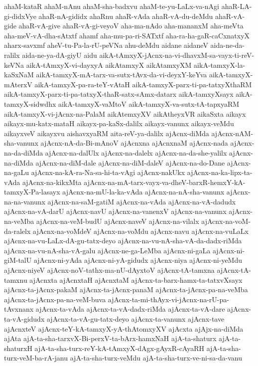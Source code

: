 {ahaM-kataR
ahaM-nAnu
ahaM-sha-badxvu
ahaM-te-yu-LaLx-va-nAgi
ahaR-LA-gi-didxVye
ahaR-nA-gididx
ahaRnu
ahaR-vAda
ahaR-vA-du-deMdu
ahaR-vA-gide
ahaR-vA-give
ahaR-vA-gi-veyoV
aha-ma-nAdo
aha-mananxM
aha-meVta
aha-meV-vA-dha-sAtxtf
ahamf
aha-mu-pa-ri-SATxtf
aha-ra-ha-gaR-caCxnatxyX
aharx-savxmf
aheV-tu-Pa-la-rU-peVNa
ahu-deMdu
aidane
aidaneV
aida-ne-da-ralilx
aida-ne-ya-dA-giyU
aidu
aikA-tAmxyX-jAcnx-na-vi-dhavxM-sa-vayx-ti-reV-keVNa
aikA-tAmxyX-vi-dayxyA
aikAtamxyX
aikAtamxyXM
aikA-tamxyX-la-kaSxNaM
aikA-tamxyX-mA-tarx-va-sutx-tAvx-da-vi-deyxY-keYva
aikA-tamxyX-mAterxV
aikA-tamxyX-pa-ra-teY-vAtaH
aikA-tamxyX-parx-ti-pa-tatxyXthaRM
aikA-tamxyX-parx-ti-pa-tatxyX-thaR-satx-sAmx-datarx
aikA-tamxyXsayx
aikA-tamxyX-sidwdhx
aikA-tamxyX-vaMtoV
aikA-tamxyX-va-sutx-tA-tapxyaRM
aikA-tamxyX-vi-jAcnx-na-PalaM
aikAtemxyXV
aikAtheyxVR
aikaSxta
aikayx
aikayx-mu-katx-mataH
aikayx-pa-kaSx-dalilx
aikayx-vanunx
aikayx-veMdu
aikayxveV
aikayxvu
aishavxyaRM
aita-reV-ya-dalilx
ajAcnx-diMda
ajAcnx-nAM-sha-vanunx
ajAcnx-nA-da-Bi-mAnoV
ajAcnxna
ajAcnxnaM
ajAcnx-nada
ajAcnx-na-da-diMda
ajAcnx-na-dalUlx
ajAcnx-na-dalelx
ajAcnx-na-da-she-yalilx
ajAcnx-na-diMda
ajAcnx-na-diM-dale
ajAcnx-na-diM-daleV
ajAcnx-na-do-Dane
ajAcnx-na-gaLu
ajAcnx-na-kA-ra-Na-sa-hi-ta-vAgi
ajAcnx-nakUkx
ajAcnx-na-ka-lipx-ta-vAda
ajAcnx-na-kikxMta
ajAcnx-na-mA-tarx-vayx-va-dheV-barxR-hemxY-kA-tamxyX-Pa-lasayx
ajAcnx-na-mU-la-ka-vAda
ajAcnx-na-nA-sha-vanunx
ajAcnx-na-na-vanunx
ajAcnx-na-saM-gatiM
ajAcnx-na-vAda
ajAcnx-na-vA-dadudx
ajAcnx-na-vA-darU
ajAcnx-navU
ajAcnx-na-vanenxV
ajAcnx-na-vanunx
ajAcnx-na-veMba
ajAcnx-na-veM-budU
ajAcnx-naveV
ajAcnx-na-vilalx
ajAcnx-na-voM-da-ralelx
ajAcnx-na-voMdeV
ajAcnx-na-voMdu
ajAcnx-navu
ajAcnx-na-vuLaLx
ajAcnx-na-vu-LaLx-dA-gu-tatx-deyo
ajAcnx-na-vu-nA-sha-vA-da-dadx-riMda
ajAcnx-na-vu-nA-sha-vA-galu
ajAcnx-ne-ga-LeMba
ajAcnx-ni-gaLa
ajAcnx-ni-giM-talU
ajAcnx-ni-yAda
ajAcnx-ni-yA-gidudx
ajAcnx-niya
ajAcnx-ni-yeMdu
ajAcnx-niyeV
ajAcnx-noV-tathx-ma-nU-dAyxtoV
ajAcnx-tA-tamxna
ajAcnx-tA-tamxnu
ajAcnxta
ajAcnxtaH
ajAcnxtaM
ajAcnx-ta-barx-hamx-ta-tatxvXsayx
ajAcnx-ta-jAcnx-pakaM
ajAcnx-ta-jAcnx-panaM
ajAcnx-ta-jAcnx-pa-na-veMba
ajAcnx-ta-jAcnx-pa-na-veM-buva
ajAcnx-ta-mi-thAyx-vi-jAcnx-na-rU-pa-tAvxnanx
ajAcnx-ta-vAda
ajAcnx-ta-vA-dadx-riMda
ajAcnx-ta-vA-dare
ajAcnx-ta-vA-gidudx
ajAcnx-ta-vA-gu-tatx-deyo
ajAcnx-ta-vanunx
ajAcnx-tave
ajAcnxteV
ajAcnx-teY-kA-tamxyX-yA-thAtomxyXV
ajAcxta
ajAjx-na-diMda
ajAta
ajA-ta-sha-tarxvX-Bi-perxV-ta-bArx-hamxNaH
ajA-ta-shaturx
ajA-ta-shaturxH
ajA-ta-sha-turx-reY-kA-tAmxyX-dAgx-gAyxR-cAyaRH
ajA-ta-sha-turx-veM-ba-rA-janu
ajA-ta-sha-turx-veMdu
ajA-ta-sha-turx-ve-ni-sa-da-vanu
}
